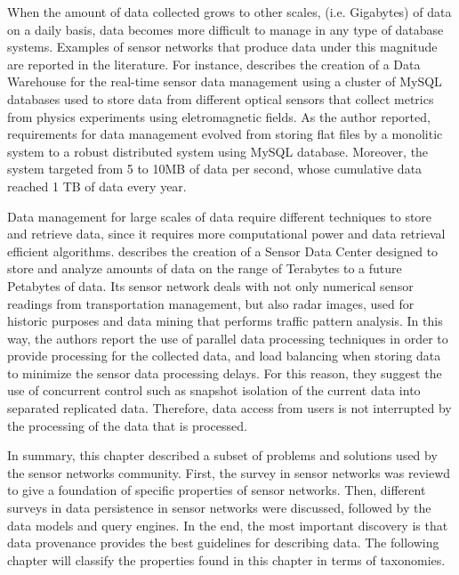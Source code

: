 When the amount of data collected grows to other scales, (i.e. Gigabytes) of data
on a daily basis, data becomes more difficult to manage in any type of
database systems. Examples of sensor networks that produce data under this
magnitude are reported in the literature. For instance, 
\cite{sn-dataware-house} describes the creation of a Data Warehouse for the
real-time sensor data management using a cluster of MySQL databases used to
store data from different optical sensors that collect metrics
from physics experiments using eletromagnetic fields. As the author reported,
requirements for data management evolved from storing flat files by a
monolitic system to a robust distributed system using MySQL database.
Moreover, the system targeted from 5 to 10MB of data per second, whose
cumulative data reached 1 TB of data every year.

Data management for large scales of data require different techniques to store
and retrieve data, since it requires more computational power and data
retrieval efficient algorithms. \cite{sn-data-center} describes the creation of
a Sensor Data Center designed to store and analyze amounts of data on the range of
Terabytes to a future Petabytes of data. Its sensor network deals with not only
numerical sensor readings from transportation management, but also radar
images, used for historic purposes and data mining that performs traffic
pattern analysis. In this way, the authors report the use of parallel data
processing techniques in order to provide processing for the collected
data, and load balancing when storing data to minimize the sensor data
processing delays. For this reason, they suggest the use of concurrent control
such as snapshot isolation of the current data into separated replicated data.
Therefore, data access from users is not interrupted by the processing of
the data that is processed.

In summary, this chapter described a subset of problems and solutions used by
the sensor networks community. First, the survey in sensor networks was
reviewd to give a foundation of specific properties of sensor networks. Then,
different surveys in data persistence in sensor networks were discussed,
followed by the data models and query engines. In the end, the most important 
discovery is that data provenance provides the best guidelines for describing 
data. The following chapter will classify the properties found in this chapter
in terms of taxonomies.